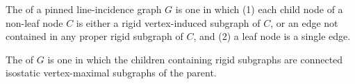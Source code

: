 
\begin{definition}
The  of a  pinned line-incidence graph $G$ is one in which
(1) each child node of a non-leaf node $C$ is either a  rigid vertex-induced subgraph of $C$,
or an edge not contained in any  proper rigid subgraph of $C$, and (2) a leaf node is a single edge.

The  of $G$  is one in which 
the  children containing rigid subgraphs are connected isostatic vertex-maximal subgraphs of the parent.
\end{definition}



